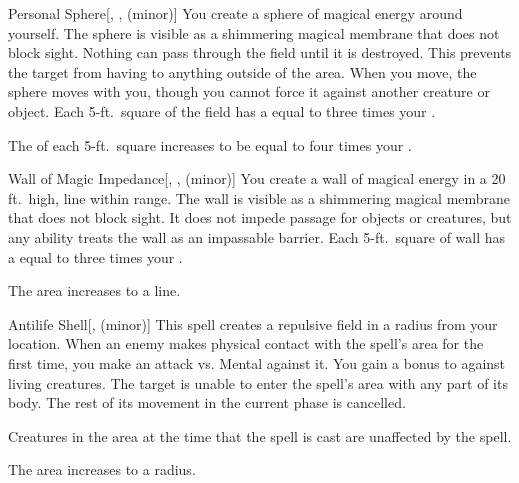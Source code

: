 \lowercase{\hypertarget{spell:Personal Sphere}{}}\label{spell:Personal Sphere}
\begin{freeability}[Rank 5]{\hypertarget{spell:Personal Sphere}{Personal Sphere}}[, ,  (minor)]
You create a sphere of magical energy around yourself.
The sphere is visible as a shimmering magical membrane that does not block sight.
Nothing can pass through the field until it is destroyed.
This prevents the target from having  to anything outside of the area.
When you move, the sphere moves with you, though you cannot force it against another creature or object.
Each 5-ft.\ square of the field has a  equal to three times your .

\rankline
{} The  of each 5-ft.\ square increases to be equal to four times your .
\end{freeability}
\vspace{0.25em}



\lowercase{\hypertarget{spell:Wall of Magic Impedance}{}}\label{spell:Wall of Magic Impedance}
\begin{freeability}[Rank 5]{\hypertarget{spell:Wall of Magic Impedance}{Wall of Magic Impedance}}[, ,  (minor)]
\targetrule
You create a wall of magical energy in a 20 ft.\ high, \areamed line within \rngmed range.
The wall is visible as a shimmering magical membrane that does not block sight.
It does not impede passage for objects or creatures, but any  ability treats the wall as an impassable barrier.
Each 5-ft.\ square of wall has a  equal to three times your .

\rankline
{} The area increases to a \arealarge line.
\end{freeability}
\vspace{0.25em}



\lowercase{\hypertarget{spell:Antilife Shell}{}}\label{spell:Antilife Shell}
\begin{freeability}[Rank 6]{\hypertarget{spell:Antilife Shell}{Antilife Shell}}[,  (minor)]
This spell creates a repulsive field in a \areamed radius  from your location.
When an enemy makes physical contact with the spell's area for the first time, you make an attack vs. Mental against it.
You gain a  bonus to  against living creatures.
\hit The target is unable to enter the spell's area with any part of its body.
The rest of its movement in the current phase is cancelled.

Creatures in the area at the time that the spell is cast are unaffected by the spell.

\rankline
{} The area increases to a \arealarge radius.
\end{freeability}
\vspace{0.25em}




